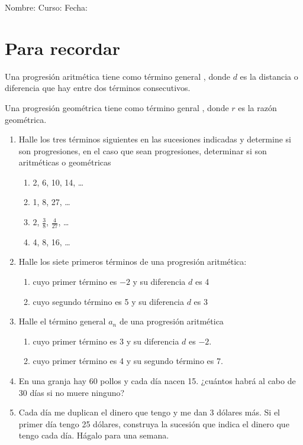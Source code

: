 \documentclass[fleqn]{article}
\newcommand{\LineaNombre}{%
\par
\vspace{\baselineskip}
Nombre:\hrulefill \; Curso: \underline{\hspace*{48pt}} \; Fecha: \underline{\hspace*{2.5cm}} \relax
\par}
\begin{document}
\LineaNombre
\section*{Para recordar}
Una progresi\'on aritmética tiene como término general , donde $d$ es la distancia o diferencia que hay entre dos términos consecutivos.

Una progresión geométrica tiene como término genral ,
donde $r$ es la razón geométrica.
\begin{enumerate}
\item Halle los tres términos siguientes en las sucesiones indicadas y determine si son progresiones, en el caso que sean progresiones, determinar si son aritméticas o geométricas
\begin{enumerate}
\item 2, 6, 10, 14, \ldots \noanswer
\item 1, 8, 27, \ldots \noanswer
\item $2$, $\frac{3}{8}$, $\frac{4}{27}$, \ldots \noanswer
\item 4, 8, 16, \ldots \noanswer
\end{enumerate}
\item Halle los siete primeros términos de una progresión aritmética:
\begin{enumerate}
\item cuyo primer término es $-2$ y su diferencia $d$ es 4 \noanswer[.75in]
\item cuyo segundo término es 5 y su diferencia $d$ es 3 \noanswer[.75in]
\end{enumerate}
\newpage
\item Halle el término general $a_{n}$ de una progresión aritmética
\begin{enumerate}
\item cuyo primer término es 3 y su diferencia $d$ es $-2$. \noanswer
\item cuyo primer término es 4 y su segundo término es 7.\noanswer
\end{enumerate}
\item En una granja hay 60 pollos y cada día nacen 15. ¿cuántos habrá al cabo de 30 días si no muere ninguno?\noanswer
\item Cada día me duplican el dinero que tengo y me dan 3 dólares más. Si el primer día tengo 25 dólares, construya la sucesión que indica el dinero que tengo cada día. Hágalo para una semana.\noanswer
\end{enumerate}
\end{document}
